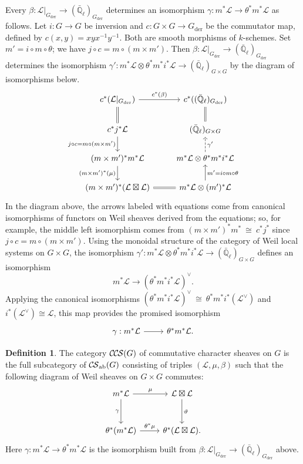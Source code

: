 \documentclass[10pt]{amsart}
\theoremstyle{plain}
\theoremstyle{definition}
\newtheorem{definition}[theorem]{Definition}
\newcommand{\EE}{\mathbb{\bar Q}_\ell}
\newcommand{\Fq}{k}
\newcommand{\der}{_{\operatorname{der}}}
\newcommand{\iso}{{\ \cong\ }}
\newcommand{\cs}[1]{{\mathcal{#1}}}
\newcommand{\CS}{{\mathcal{C\hskip-0.8pt S}}}
\newcommand{\CCS}{{\mathcal{C\hskip-.8pt C\hskip-0.8pt S}}}
\newcommand{\CSab}{\CS_{\operatorname{ab}}}
\begin{document}
Every $\beta : \cs{L}\vert_{G\der} \to (\EE)_{G\der}$ determines an isomorphism $\gamma : m^*\cs{L} \to \theta^*m^*\cs{L}$ as follows.
Let $i : G \to G$ be inversion and $c : G\times G\to G\der$ be the commutator map, defined by $c(x,y)= xyx^{-1}y^{-1}$.
Both are smooth morphisms of $\Fq$-schemes.
Set $m' = i \circ m \circ \theta$; we have $j\circ c = m \circ (m \times m')$.
Then $\beta : \cs{L}\vert_{G\der} \to (\EE)_{G\der}$ determines the isomorphism $\gamma' : m^*\cs{L} \otimes \theta^* m^* i^*\cs{L} \to (\EE)_{G\times G}$ by the diagram of isomorphisms below.
\begin{equation}
\begin{tikzcd}
\arrow[equal]{d} c^* (\cs{L}\vert_{G\der}) \arrow{r}{c^*(\beta)} 
	&  c^*((\EE)_{G\der}) \arrow[equal]{d} \\
\arrow{d}[swap]{j\circ c = m \circ (m \times m')} c^* j^* \cs{L} 
	&   (\EE)_{G\times G} \\
(m \times m')^* m^* \cs{L} \arrow{d}[swap]{(m \times m')^*(\mu)} 
	&  m^*\cs{L} \otimes \theta^* m^* i^* \cs{L}  \arrow[dashed]{u}[swap]{\gamma'} \\
(m \times m')^* (\cs{L} \boxtimes \cs{L}) \arrow[equal]{r} 
	& m^*\cs{L} \otimes (m')^*\cs{L} \arrow{u}[swap]{m' = i\circ m\circ \theta} 
\end{tikzcd}
\end{equation}
In the diagram above, the arrows labeled with equations come from canonical isomorphisms of functors on Weil sheaves derived from the equations; so, for example, the middle left isomorphism comes from $(m\times m')^* m^* \iso c^* j^*$ since $j\circ c = m \circ (m \times m')$.
Using the monoidal structure of the category of Weil local systems on $G\times G$, the isomorphism $\gamma' : m^*\cs{L} \otimes \theta^* m^* i^*\cs{L} \to (\EE)_{G\times G}$ defines an isomorphism
\[
m^*\cs{L} \to (\theta^* m^* i^*\cs{L})^\vee.
\]
Applying the canonical isomorphisms $(\theta^* m^* i^*\cs{L})^\vee \iso \theta^* m^* i^* (\cs{L}^\vee)$ and $i^*(\cs{L}^\vee) \cong \cs{L}$, this map provides the promised isomorphism
\[
\begin{tikzcd}
\gamma : m^*\cs{L} \arrow{r} & \theta^* m^* \cs{L}.
\end{tikzcd}
\]

\begin{definition}\label{def:CCS}
The category $\CCS(G)$ of commutative character sheaves on $G$ is the full subcategory of $\CSab(G)$ consisting of triples $(\cs{L},\mu,\beta)$ such that the following diagram of Weil sheaves on $G \times G$ commutes:
  \[
  \begin{tikzcd}[row sep=30]
   m^*\cs{L} \arrow{d}[swap]{\gamma} \arrow{r}{\mu} & \cs{L}\boxtimes\cs{L} \arrow{d}{\vartheta}\\
   \theta^*(m^*\cs{L}) \arrow{r}{{\theta}^*\mu} &  \theta^*(\cs{L}\boxtimes\cs{L}).
  \end{tikzcd}
  \]
Here $\gamma : m^*\cs{L} \to \theta^* m^* \cs{L}$ is the isomorphism built from $\beta : \cs{L}\vert_{G\der} \to (\EE)_{G\der}$ above. 
\end{definition}
\end{document}
